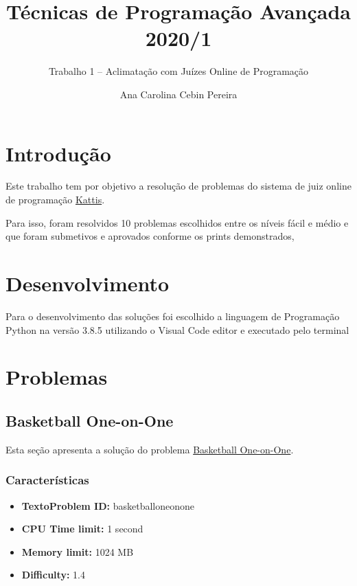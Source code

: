 \documentclass[11pt,a4paper]{scrreprt}
\title{Técnicas de Programação Avançada 2020/1}
\subtitle{Trabalho 1 -- Aclimatação com Juízes Online de Programação}
\author{Ana Carolina Cebin Pereira}
\begin{document}
\maketitle

\chapter{Introdução}

Este trabalho tem por objetivo a resolução de problemas do sistema de juiz online de programação \href{https://open.kattis.com/}{Kattis}.

Para isso, foram resolvidos 10 problemas escolhidos entre os níveis fácil e médio e que foram submetivos e aprovados conforme os prints demonstrados, 



\chapter{Desenvolvimento}

Para o desenvolvimento das soluções foi escolhido a linguagem de Programação Python na versão 3.8.5 utilizando o Visual Code editor e executado pelo terminal


\chapter{Problemas}

\section{Basketball One-on-One}

Esta seção apresenta a solução do problema \href{https://open.kattis.com/problems/basketballoneonone}{Basketball One-on-One}.

\subsection{Características}

\begin{itemize}
    \item\textbf{TextoProblem ID: } basketballoneonone
    \item\textbf{CPU Time limit: } 1 second
    \item\textbf{Memory limit: } 1024 MB
    \item\textbf{Difficulty: }  1.4
\end{itemize}
\end{document}

